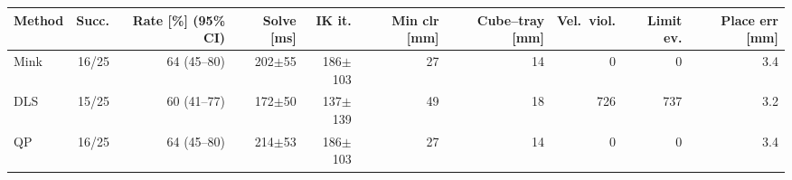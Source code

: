 \begin{tabular}{lrrrrrrrrr}
\toprule
Method & Succ. & Rate [\%] (95\% CI) & Solve [ms] & IK it. & Min clr [mm] & Cube--tray [mm] & Vel.\ viol. & Limit ev. & Place err [mm]\\
\midrule
Mink & 16/25 & 64 (45--80) & 202$\pm$55 & 186$\pm$103 & 27 & 14 & 0 & 0 & 3.4\\
DLS & 15/25 & 60 (41--77) & 172$\pm$50 & 137$\pm$139 & 49 & 18 & 726 & 737 & 3.2\\
QP & 16/25 & 64 (45--80) & 214$\pm$53 & 186$\pm$103 & 27 & 14 & 0 & 0 & 3.4\\
\bottomrule
\end{tabular}
